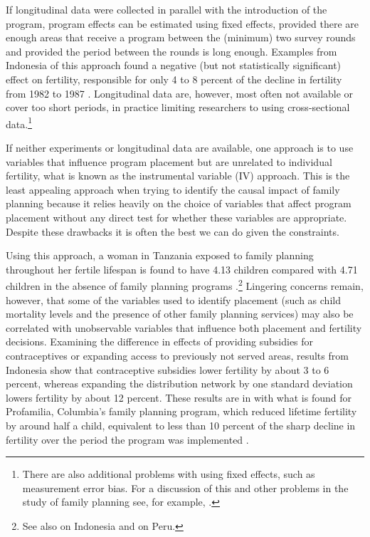 \documentclass[]{article}
\begin{document}
If longitudinal data were collected in parallel with the introduction of the program, program effects can be estimated using fixed effects, provided there are enough areas that receive a program between the (minimum) two survey rounds and provided the period between the rounds is long enough. Examples from Indonesia of this approach found a negative (but not statistically significant) effect on fertility, responsible for only 4 to 8 percent of the decline in fertility from 1982 to 1987 \citep{pitt93,Gertler1994}. Longitudinal data are, however, most often not available or cover too short periods, in practice limiting researchers to using cross-sectional data.\footnote{There are also additional problems with using fixed effects, such as measurement error bias. For a discussion of this and other problems in the study of family planning see, for example, \cite{angeles98}.}

If neither experiments or longitudinal data are available, one approach is to use variables that influence program placement but are unrelated to individual fertility, what is known as the instrumental variable (IV) approach. This is the least appealing approach when trying to identify the causal impact of family planning because it relies heavily on the choice of variables that affect program placement without any direct test for whether these variables are appropriate. Despite these drawbacks it is often the best we can do given the constraints.

Using this approach, a woman in Tanzania exposed to family planning throughout her fertile lifespan is found to have 4.13 children compared with 4.71 children in the absence of family planning programs \citep{angeles98}.\footnote{See also \citet{Angeles2005} on Indonesia and \citep{Angeles2005a} on Peru.} Lingering concerns remain, however, that some of the variables used to identify placement (such as child mortality levels and the presence of other family planning services) may also be correlated with unobservable variables that influence both placement and fertility decisions. Examining the difference in effects of providing subsidies for contraceptives or expanding access to previously not served areas, results from Indonesia show that contraceptive subsidies lower fertility by about 3 to 6 percent, whereas expanding the distribution network by one standard deviation lowers fertility by about 12 percent\citep{Molyneaux2000}. These results are in with what is found for Profamilia, Columbia's family planning program, which reduced lifetime fertility by around half a child, equivalent to less than 10 percent of the sharp decline in fertility over the period the program was implemented \citep{Miller2010}.
\end{document}
